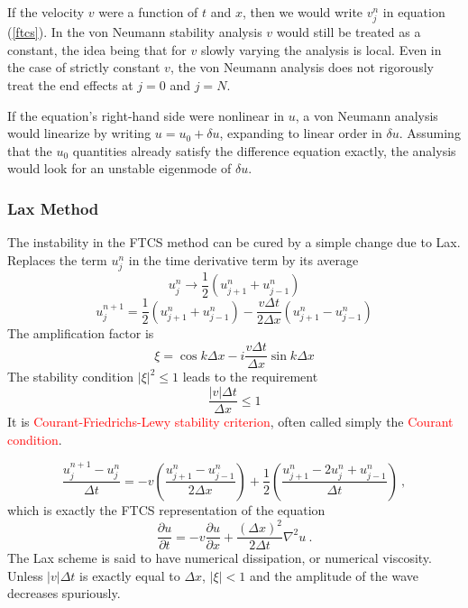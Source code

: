 \documentclass[12pt,a4paper]{article}
\begin{document}
If the velocity $v$ were a function of $t$ and $x$, then we would write $v_j^n$ in equation (\ref{ftcs}). In the von Neumann stability analysis $v$ would still be treated as a constant, the idea being that for $v$ slowly varying the analysis is local. Even in the case of strictly constant $v$, the von Neumann analysis does not rigorously treat the
end effects at $j = 0$ and $j = N$.

If the equation's right-hand side were nonlinear in $u$, a von Neumann analysis would linearize by writing $u = u_0 + \delta u$, expanding to linear order in $\delta u$. Assuming that the $u_0$ quantities already satisfy the difference equation exactly, the analysis would look for an unstable eigenmode of $\delta u$.

\subsubsection{Lax Method}
The instability in the FTCS method can be cured by a simple change due to Lax. Replaces the term $u^n_j$ in the time derivative term by its average
\begin{equation}
u^n_j \rightarrow \frac{1}{2} (u^n_{j+1} +u^n_{j-1})
\end{equation}
\begin{equation}
u_{j}^{n+1} =\frac{1}{2} (u^n_{j+1} +u^n_{j-1}) -\frac{v\Delta t }{2\Delta x}\left(u_{j+1}^{n} -u_{j-1}^{n} \right)
\end{equation}
The amplification factor is
\begin{equation}
\xi = \cos k \Delta x -i \frac{v\Delta t }{\Delta x} \sin k \Delta x 
\end{equation}
The stability condition $|\xi|^2 \leqslant 1$ leads to the requirement
\begin{equation}
\frac{|v|\Delta t }{\Delta x} \leqslant 1
\end{equation}
It is \textcolor{red}{Courant-Friedrichs-Lewy stability criterion}, often called simply the \textcolor{red}{Courant condition}.

\begin{equation}
\frac{u_{j}^{n+1} -u_{j}^{n} }{\Delta t} = -v \left( \frac{u_{j+1}^{n} -u_{j-1}^{n} }{2\Delta x}\right) +\frac{1}{2} \left( \frac{u_{j+1}^{n} -2u_j^n + u_{j-1}^{n} }{\Delta t}\right) ~,
\end{equation}
which is exactly the FTCS representation of the equation
\begin{equation}
\frac{\partial u}{\partial t} = -v\frac{\partial u}{\partial x} +\frac{(\Delta x)^2}{2\Delta t} \nabla^2 u ~.
\end{equation}
The Lax scheme is said to have numerical dissipation, or numerical viscosity. Unless $|v|\Delta t$ is exactly equal to $\Delta x$, $|\xi| < 1$ and the amplitude of the wave decreases spuriously.
\end{document}
